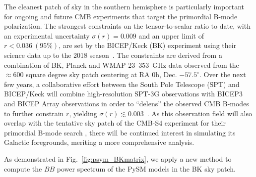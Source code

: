 \documentclass[twocolumn]{aastex631}
\begin{document}
The cleanest patch of sky in the southern hemisphere is particularly important for ongoing and future CMB experiments that target the primordial B-mode polarization. The strongest constraints on the tensor-to-scalar ratio to date, with an experimental uncertainty $\sigma(r) = 0.009$ and an upper limit of $r < 0.036~(95\%)$, are set by the BICEP/Keck (BK) experiment using their science data up to the 2018 season~\citep[``BK18'';][]{Ade:2021}. The constraints are derived from a combination of BK, Planck and WMAP 23--353~GHz data observed from the $\approx 600$ square degree sky patch centering at RA 0h, Dec. $-57.5^{\circ}$. Over the next few years, a collaborative effort between the South Pole Telescope (SPT) and BICEP/Keck will combine high-resolution SPT-3G observations with BICEP3 and BICEP Array observations in order to ``delens'' the observed CMB B-modes to further constrain $r$, yielding $\sigma(r) \lesssim 0.003$~\citep{2022arXiv220316556B}. As this observation field will also overlap with the tentative sky patch of the CMB-S4 experiment for their primordial B-mode search \citep{Abazajian:2022}, there will be continued interest in simulating its Galactic foregrounds, meriting a more comprehensive analysis. 

As demonstrated in Fig.~\ref{fig:psym_BKmatrix}, we apply a new method to compute the $BB$ power spectrum of the PySM models in the BK sky patch. 



\end{document}
